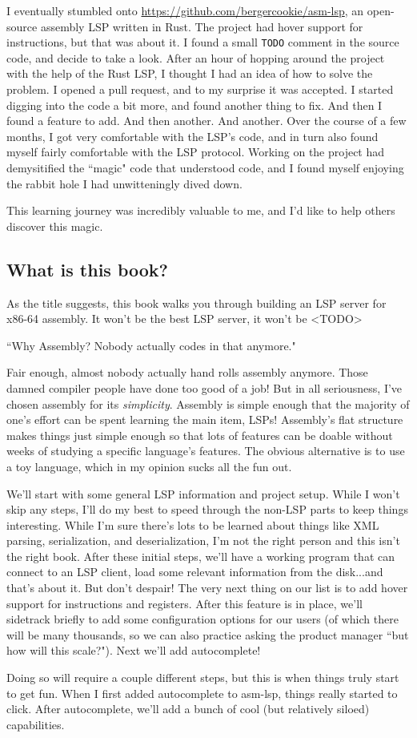 I eventually stumbled onto \href{asm-lsp}{https://github.com/bergercookie/asm-lsp},
an open-source assembly LSP written in Rust. The project had hover support for instructions,
but that was about it. I found a small \texttt{TODO} comment in the source code,
and decide to take a look. After an hour of hopping around the project with the help
of the Rust LSP, I thought I had an idea of how to solve the problem. I opened a
pull request, and to my surprise it was accepted. I started digging into the code a bit more,
and found another thing to fix. And then I found a feature to add. And then another.
And another. Over the course of a few months, I got very comfortable with the LSP's
code, and in turn also found myself fairly comfortable with the LSP protocol. Working
on the project had demysitified the ``magic" code that understood code, and I found
myself enjoying the rabbit hole I had unwitteningly dived down.

This learning journey was incredibly valuable to me, and I'd like to help others 
discover this magic. 

\subsection{What is this book?}

As the title suggests, this book walks you through building an LSP server for x86-64
assembly. It won't be the best LSP server, it won't be <TODO>

``Why Assembly? Nobody actually codes in that anymore." 

Fair enough, almost nobody actually hand rolls assembly anymore. Those damned compiler people have done
too good of a job! But in all seriousness, I've chosen assembly for its \textit{simplicity}. Assembly is simple
enough that the majority of one's effort can be spent learning the main item, LSPs! Assembly's flat structure
makes things just simple enough so that lots of features can be doable without weeks of studying a specific
language's features. The obvious alternative is to use a toy language, which in my opinion sucks all the fun out. 

We'll start with some general LSP information and project setup. While I won't skip
any steps, I'll do my best to speed through the non-LSP parts to keep things interesting.
While I'm sure there's lots to be learned about things like XML parsing, serialization, 
and deserialization, I'm not the right person and this isn't the right book. After
these initial steps, we'll have a working program that can connect to an LSP client,
load some relevant information from the disk...and that's about it. But don't despair!
The very next thing on our list is to add hover support for instructions and registers.
After this feature is in place, we'll sidetrack briefly to add some configuration
options for our users (of which there will be many thousands, so we can also practice
asking the product manager ``but how will this scale?"). Next we'll add autocomplete!

Doing so will require a couple different steps, but this is when things truly start
to get fun. When I first added autocomplete to asm-lsp, things really started to
click. After autocomplete, we'll add a bunch of cool (but relatively siloed) capabilities.
